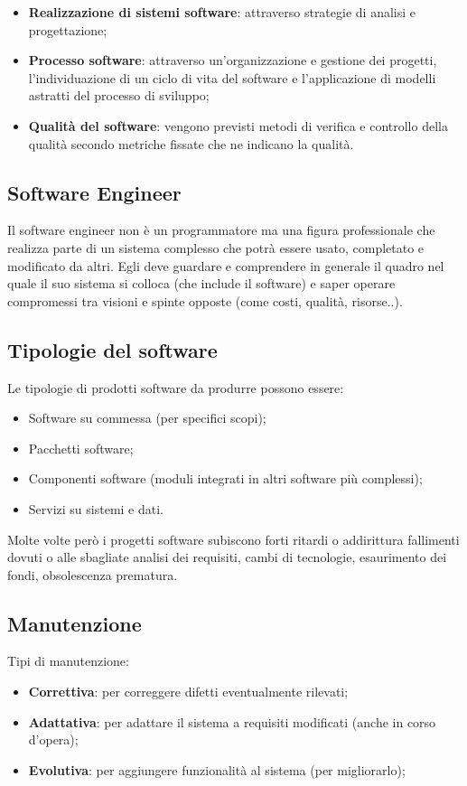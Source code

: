 \begin{itemize}
\item \textbf{Realizzazione di sistemi software}: attraverso strategie di analisi e progettazione;
\item \textbf{Processo software}: attraverso un'organizzazione e gestione dei progetti, l'individuazione di un ciclo di vita del software e l'applicazione di modelli astratti del processo di sviluppo;
\item \textbf{Qualità del software}: vengono previsti metodi di verifica e controllo della qualità secondo
metriche fissate che ne indicano la qualità.
\end{itemize}

\subsection{Software Engineer}
Il software engineer non è un programmatore ma una figura professionale che realizza parte di un sistema complesso che potrà essere usato, completato e modificato da altri. Egli deve guardare e comprendere in generale il quadro nel quale il suo sistema si colloca (che include il software) e saper operare compromessi tra visioni e spinte opposte (come costi, qualità, risorse..).

\subsection{Tipologie del software}
Le tipologie di prodotti software da produrre possono essere:
\begin{itemize}
\item Software su commessa (per specifici scopi);
\item Pacchetti software;
\item Componenti software (moduli integrati in altri software più complessi);
\item Servizi su sistemi e dati.
\end{itemize}
Molte volte però i progetti software subiscono forti ritardi o addirittura fallimenti dovuti o alle sbagliate analisi dei requisiti, cambi di tecnologie, esaurimento dei fondi, obsolescenza prematura.

\subsection{Manutenzione}
Tipi di manutenzione:
\begin{itemize}
\item \textbf{Correttiva}: per correggere difetti eventualmente rilevati;
\item \textbf{Adattativa}: per adattare il sistema a requisiti modificati (anche in corso d'opera);
\item \textbf{Evolutiva}: per aggiungere funzionalità al sistema (per migliorarlo);
\end{itemize}